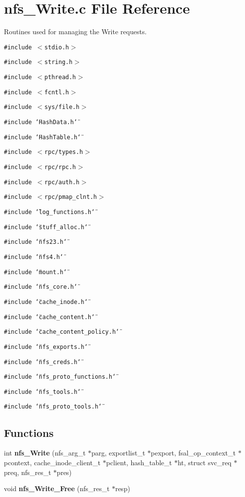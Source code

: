 \section{nfs\_\-Write.c File Reference}
\label{nfs__Write_8c}
Routines used for managing the Write requests. 

{\tt \#include $<$stdio.h$>$}\par
{\tt \#include $<$string.h$>$}\par
{\tt \#include $<$pthread.h$>$}\par
{\tt \#include $<$fcntl.h$>$}\par
{\tt \#include $<$sys/file.h$>$}\par
{\tt \#include \char`\"{}Hash\-Data.h\char`\"{}}\par
{\tt \#include \char`\"{}Hash\-Table.h\char`\"{}}\par
{\tt \#include $<$rpc/types.h$>$}\par
{\tt \#include $<$rpc/rpc.h$>$}\par
{\tt \#include $<$rpc/auth.h$>$}\par
{\tt \#include $<$rpc/pmap\_\-clnt.h$>$}\par
{\tt \#include \char`\"{}log\_\-functions.h\char`\"{}}\par
{\tt \#include \char`\"{}stuff\_\-alloc.h\char`\"{}}\par
{\tt \#include \char`\"{}nfs23.h\char`\"{}}\par
{\tt \#include \char`\"{}nfs4.h\char`\"{}}\par
{\tt \#include \char`\"{}mount.h\char`\"{}}\par
{\tt \#include \char`\"{}nfs\_\-core.h\char`\"{}}\par
{\tt \#include \char`\"{}cache\_\-inode.h\char`\"{}}\par
{\tt \#include \char`\"{}cache\_\-content.h\char`\"{}}\par
{\tt \#include \char`\"{}cache\_\-content\_\-policy.h\char`\"{}}\par
{\tt \#include \char`\"{}nfs\_\-exports.h\char`\"{}}\par
{\tt \#include \char`\"{}nfs\_\-creds.h\char`\"{}}\par
{\tt \#include \char`\"{}nfs\_\-proto\_\-functions.h\char`\"{}}\par
{\tt \#include \char`\"{}nfs\_\-tools.h\char`\"{}}\par
{\tt \#include \char`\"{}nfs\_\-proto\_\-tools.h\char`\"{}}\par
\subsection*{Functions}
\begin{CompactItemize}
\item 
int {\bf nfs\_\-Write} (nfs\_\-arg\_\-t $\ast$parg, exportlist\_\-t $\ast$pexport, fsal\_\-op\_\-context\_\-t $\ast$pcontext, cache\_\-inode\_\-client\_\-t $\ast$pclient, hash\_\-table\_\-t $\ast$ht, struct svc\_\-req $\ast$preq, nfs\_\-res\_\-t $\ast$pres)
\item 
void {\bf nfs\_\-Write\_\-Free} (nfs\_\-res\_\-t $\ast$resp)
\end{CompactItemize}
